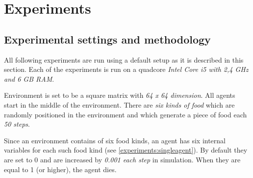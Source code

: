 \chapter{Experiments}




\section{Experimental settings and methodology}

All following experiments are run using a default setup as it is described in this section. Each of the experiments is run on a quadcore \emph{Intel Core i5 with 2,4 GHz and 6 GB RAM}. 
                                                   
Environment is set to be a square matrix with \emph{64 x 64 dimension}. All agents start in the middle of the environment. There are \emph{six kinds of food} which are randomly positioned in the environment and which generate a piece of food each \emph{50 steps}.

Since an environment contains of six food kinds, an agent has six internal variables for each such food kind (see \ref{experiments:singleagent}). By default they are set to 0 and are increased by \emph{0.001 each step} in simulation. When they are equal to 1 (or higher), the agent dies.  

